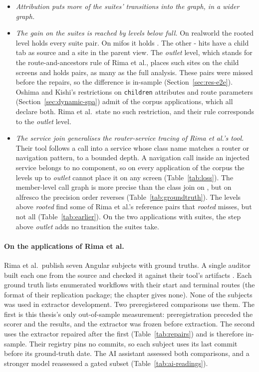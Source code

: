 \begin{itemize}
\item \emph{Attribution puts more of the suites' transitions into the graph, in a wider graph.}
\item \emph{The gain on the suites is reached by levels below \emph{full}.} On realworld the rooted level holds
  every suite pair. On mifos it holds \EtoEMifosHitRooted{}. The other
  \the\numexpr\EtoEMifosHitOutlet-\EtoEMifosHitRooted\relax{} hits have a child tab as source and a
  site in the parent view. The \emph{outlet} level, which stands for the route-and-ancestors rule of Rima et
  al., places such sites on the child screens and
  holds \EtoEMifosHitOutlet{} pairs, as many as the full analysis. These pairs were missed before
  the repairs, so the difference is in-sample (Section~\ref{sec:res-e2e}). Oshima and Kishi's
  restrictions on \texttt{children} attributes and route parameters (Section~\ref{sec:dynamic-spa})
  admit \EarlierWorkAdmittedApps{} of the \EarlierWorkApps{} corpus applications, which all declare
  both. Rima et al.\ state no such restriction, and their rule corresponds to the \emph{outlet}
  level.
\item \emph{The service join generalises the router-service tracing of Rima et al.'s tool.} Their tool
  follows a call into a service whose class name matches a router or navigation pattern, to a
  bounded depth. A navigation call inside an injected service belongs to no component, so on every
  application of the corpus the levels up to \emph{outlet} cannot place it on any screen
  (Table~\ref{tab:loss}). The member-level call graph is more precise than the class join on
  \GTApp{}, but on alfresco the precision order reverses (Table~\ref{tab:groundtruth}). The levels
  above \emph{rooted} find some of Rima et al.'s reference pairs that \emph{rooted} misses, but not all (Table~\ref{tab:earlier}). On the two applications with
  suites, the step above \emph{outlet} adds no transition the suites take.
\end{itemize}

\paragraph{On the applications of Rima et al.}
\label{sec:res-rima}

Rima et al.\ publish seven Angular subjects with ground truths. A single auditor built each one from
the source and checked it against their tool's artifacts \cite{rima2026e2e}. Each ground truth lists
enumerated workflows with their start and terminal routes (the format of their replication package; the chapter gives none). None of
the subjects was used in extractor development. Two preregistered comparisons use them. The first
is this thesis's only out-of-sample measurement: preregistration preceded the scorer and the
results, and the extractor was frozen before extraction. The second uses the extractor repaired
after the first (Table~\ref{tab:repairs}) and is therefore in-sample. Their registry pins no
commits, so each subject uses its last commit before its ground-truth date. The AI assistant
assessed both comparisons, and a stronger model reassessed a gated subset (Table~\ref{tab:ai-readings}).

